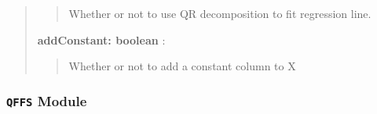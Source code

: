 \documentclass[letterpaper,10pt,english]{sphinxmanual}
\begin{document}
\begin{fulllineitems}
\begin{fulllineitems}
\begin{quote}
\begin{description}
\begin{quote}
Whether or not to use QR decomposition to fit regression line.
\end{quote}

\textbf{addConstant: boolean} :
\begin{quote}

Whether or not to add a constant column to X
\end{quote}

\end{description}\end{quote}

\end{fulllineitems}


\end{fulllineitems}



\subsubsection{\texttt{QFFS} Module}
\label{qikify.controllers:qffs-module}\label{qikify.controllers:module-qikify.controllers.QFFS}
\end{document}
